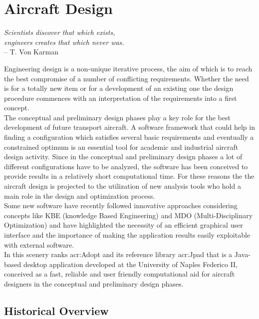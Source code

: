 \chapter{Aircraft Design}
\label{ch:aircraftdesign}

\begin{flushright}
	{\smaller
		\textit{Scientists discover that which exists,\\ engineers creates that which
never was.}\\
		-- T. Von Karman}
\end{flushright}

Engineering design is a non-unique iterative process, the aim of which is to reach the best compromise of a number of conflicting requirements. Whether the need is for a totally new item or for a development of an existing one the design procedure commences with an interpretation of the requirements into a first concept.\\
The conceptual and preliminary design phases play a key role for the best development of future transport aircraft. A software framework that could help in finding a configuration which satisfies several basic requirements and eventually a constrained optimum is an essential tool for academic and industrial aircraft design activity.
Since in the conceptual and preliminary design phases a lot of different configurations have to be analyzed, the software has been conceived to provide results in a relatively short computational time.
For these reasons the the aircraft design is projected to the utilization of new analysis tools who hold a main role in the design and optimization process.\\
Some new software have recently followed innovative approaches considering concepts like KBE (knowledge Based Engineering) and \gls{MDO} (Multi-Disciplinary Optimization) and have highlighted the necessity of an efficient graphical user interface and the importance of making the application results easily exploitable with external software.\\
In this scenery ranks \gls{acr:Adopt} and its reference library \gls{acr:Jpad} that is a Java-based desktop application developed at the University of Naples Federico II, conceived as a fast, reliable and user friendly computational aid for aircraft designers in the conceptual and preliminary design phases.


\section{Historical Overview} 


